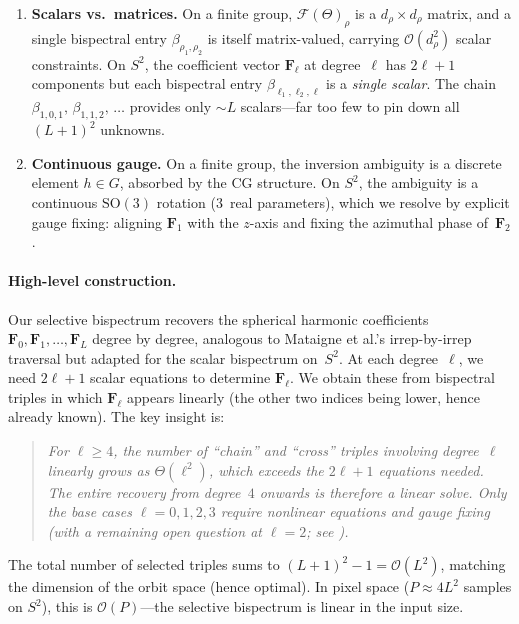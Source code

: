 \documentclass{article}
\theoremstyle{plain}
\theoremstyle{definition}
\theoremstyle{remark}
\newcommand{\SO}{\mathrm{SO}}
\begin{document}
\begin{enumerate}[nosep]
  \item \textbf{Scalars vs.\ matrices.}
    On a finite group, $\mathcal{F}(\Theta)_\rho$ is a
    $d_\rho \times d_\rho$ matrix, and a single bispectral entry
    $\beta_{\rho_1,\rho_2}$ is itself matrix-valued, carrying
    $\mathcal{O}(d_\rho^2)$ scalar constraints. On $S^2$, the coefficient
    vector $\mathbf{F}_\ell$ at degree~$\ell$ has $2\ell+1$ components
    but each bispectral entry $\beta_{\ell_1,\ell_2,\ell}$ is a
    \emph{single scalar}. The chain
    $\beta_{1,0,1},\,\beta_{1,1,2},\,\dotsc$ provides only $\sim L$
    scalars---far too few to pin down all $(L+1)^2$ unknowns.

  \item \textbf{Continuous gauge.}
    On a finite group, the inversion ambiguity is a discrete element
    $h \in G$, absorbed by the CG structure. On $S^2$, the ambiguity
    is a continuous $\SO(3)$ rotation (3~real parameters), which we
    resolve by explicit gauge fixing: aligning $\mathbf{F}_1$ with the
    $z$-axis and fixing the azimuthal phase of~$\mathbf{F}_2$.
\end{enumerate}

\paragraph{High-level construction.}
Our selective bispectrum recovers the spherical harmonic coefficients
$\mathbf{F}_0, \mathbf{F}_1, \dotsc, \mathbf{F}_L$ degree by degree,
analogous to Mataigne et al.'s irrep-by-irrep traversal but adapted
for the scalar bispectrum on~$S^2$.  At each degree~$\ell$, we need
$2\ell+1$ scalar equations to determine $\mathbf{F}_\ell$. We obtain
these from bispectral triples in which $\mathbf{F}_\ell$ appears
linearly (the other two indices being lower, hence already known). The
key insight is:

\begin{quote}
  \emph{For $\ell \ge 4$, the number of ``chain'' and ``cross'' triples
  involving degree~$\ell$ linearly grows as $\Theta(\ell^2)$, which
  exceeds the $2\ell+1$ equations needed. The entire recovery from
  degree~$4$ onwards is therefore a linear solve. Only the base cases
  $\ell = 0, 1, 2, 3$ require nonlinear equations and gauge fixing
  (with a remaining open question at $\ell = 2$; see
  ).}
\end{quote}

\noindent
The total number of selected triples sums to $(L+1)^2 - 1
= \mathcal{O}(L^2)$, matching the dimension of the orbit space
(hence optimal). In pixel space ($P \approx 4L^2$ samples on $S^2$),
this is $\mathcal{O}(P)$---the selective bispectrum is linear in the
input size.
\end{document}

